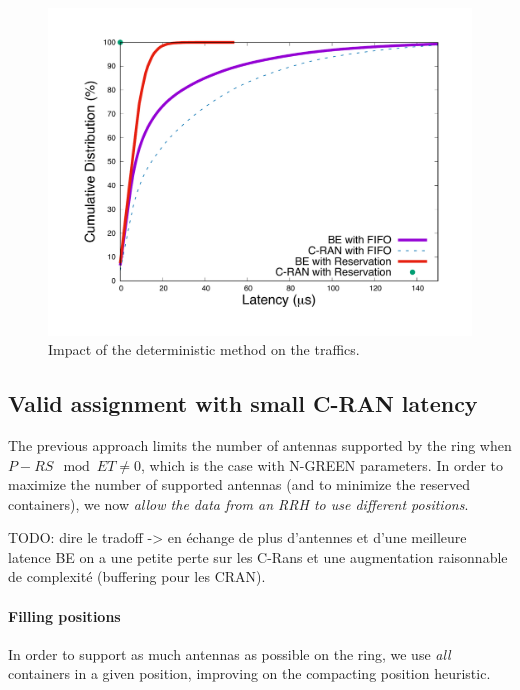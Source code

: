 \documentclass[10pt, conference, letterpaper]{IEEEtran}
\newcommand{\todo}[1]{{\color{red} TODO: {#1}}}
\begin{document}
  
  
  \begin{figure}[h!]
\begin{center}   

     \includegraphics[scale=0.25]{optim.pdf}
     \caption{Impact of the deterministic method on the traffics.}   \label{fig:optimres}

\end{center}
  \end{figure}
  
\subsection{Valid assignment with small C-RAN latency}
\label{sec:maxant}

The previous approach limits the number of antennas supported by the ring when $P-RS \mod ET \neq 0$, which is the case with N-GREEN parameters. In order to maximize the number of supported antennas (and to minimize the reserved containers), we now \emph{allow the data from an RRH to use different positions}. 

\todo{dire le tradoff -> en échange de plus d'antennes et d'une meilleure latence BE on a une 
petite perte sur les C-Rans et une augmentation raisonnable de complexité (buffering pour les CRAN).}


\paragraph{Filling positions}

In order to support as much antennas as possible on the ring, we use \emph{all} containers in a given position, improving on the compacting position heuristic. 
\end{document}
